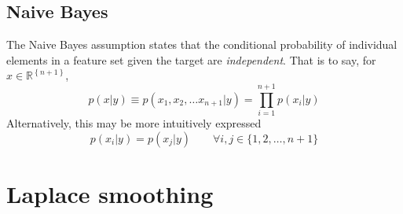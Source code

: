 \documentclass{article}
\theoremstyle{definition}
\theoremstyle{remark}
\begin{document}
\subsection{Naive Bayes}
The Naive Bayes assumption states that the conditional probability of individual elements in a feature set given the target are \textit{independent}.
That is to say, for $x\in\mathbb{R}^\left\{ n + 1 \right\}$,
\begin{equation}
  p(x|y) \equiv p(x_{1}, x_{2}, \dots x_{n+1}| y) = \prod_{i = 1}^{n+1}p(x_{i}|y)
  \label{eqn:naivebayesassumption}
\end{equation}
Alternatively, this may be more intuitively expressed 
\begin{equation}
p(x_{i}|y) = p(x_{j}|y) \qquad \forall i,j \in \{1, 2, \dots, n + 1\}
  \label{eqn:intuitivenaivebayes}
\end{equation}
\section{Laplace smoothing}
\end{document}
